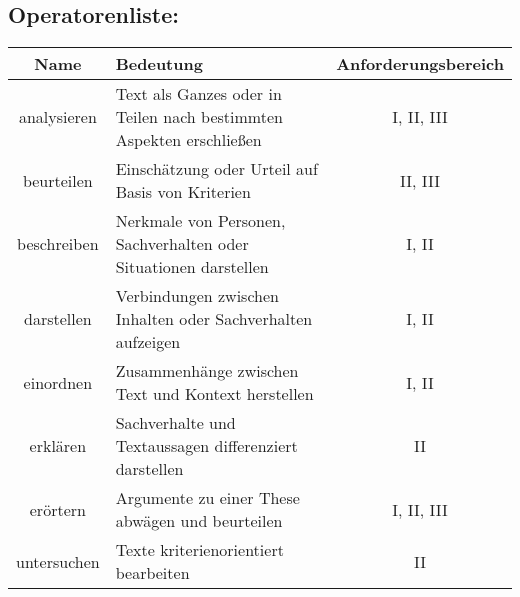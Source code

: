 
\subsection{Operatorenliste:}

\setlength{\tabcolsep}{4pt}

\renewcommand{\arraystretch}{1.3}
\begin{tabularx}{\textwidth}{|c|X|c|}
    \hline
    Name & Bedeutung & Anforderungsbereich \\
    \hline
    analysieren & Text als Ganzes oder in Teilen nach bestimmten Aspekten erschließen & I, II, III \\
    \hline
    beurteilen & Einschätzung oder Urteil auf Basis von Kriterien & II, III \\
    \hline
    beschreiben & Nerkmale von Personen, Sachverhalten oder Situationen darstellen & I, II \\
    \hline
    darstellen & Verbindungen zwischen Inhalten oder Sachverhalten aufzeigen & I, II \\
    \hline 
    einordnen & Zusammenhänge zwischen Text und Kontext herstellen & I, II \\
    \hline
    erklären & Sachverhalte und Textaussagen differenziert darstellen & II \\
    \hline
    erörtern & Argumente zu einer These abwägen und beurteilen & I, II, III \\
    \hline 
    untersuchen & Texte kriterienorientiert bearbeiten & II \\
    \hline
\end{tabularx}
